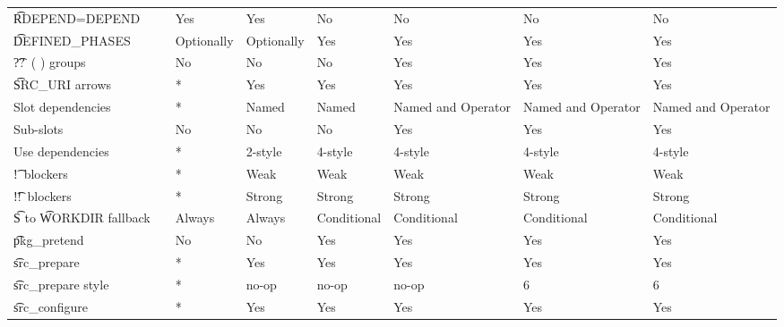 \begin{landscape}
\begin{longtable}{llP{7.5em}P{7.5em}P{7.5em}P{7.5em}P{7.5em}P{7.5em}}
\t{RDEPEND=DEPEND} &  &
    Yes & Yes & No & No & No & No \\

\t{DEFINED_PHASES} &  &
    Optionally & Optionally & Yes & Yes & Yes & Yes \\

\t{??\ ( )} groups &  &
    No & No & No & Yes & Yes & Yes \\

\t{SRC_URI} arrows &  &
    * & Yes & Yes & Yes & Yes & Yes \\

Slot dependencies &  &
    * & Named & Named & Named and Operator & Named and Operator & Named and Operator \\

Sub-slots &  &
    No & No & No & Yes & Yes & Yes \\

Use dependencies &  &
    * & 2-style & 4-style & 4-style & 4-style & 4-style \\

\t{!}\ blockers &  &
    * & Weak & Weak & Weak & Weak & Weak \\

\t{!!}\ blockers &  &
    * & Strong & Strong & Strong & Strong & Strong \\

\t{S} to \t{WORKDIR} fallback &  &
    Always & Always & Conditional & Conditional & Conditional & Conditional \\

\t{pkg_pretend} &  &
    No & No & Yes & Yes & Yes & Yes \\

\t{src_prepare} &  &
    * & Yes & Yes & Yes & Yes & Yes \\

\t{src_prepare} style &  &
    * & no-op & no-op & no-op & 6 & 6 \\

\t{src_configure} &  &
    * & Yes & Yes & Yes & Yes & Yes \\


\end{longtable}
\end{landscape}
